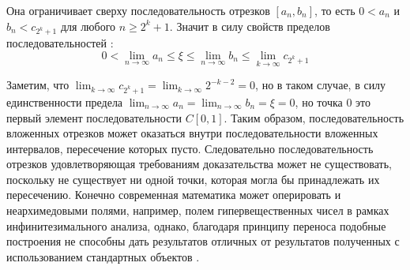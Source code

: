 \documentclass[12pt]{article}
\begin{document}
Она ограничивает сверху последовательность отрезков $[a_n, b_n]$, то есть $0 < a_n$ и $b_n < c_{2^k + 1}$ для любого $n \geq 2^k + 1$. Значит в силу свойств пределов последовательностей \cite{matan-limit-properties}:
\begin{equation}
0 < \lim_{n\to\infty} a_n \leq \xi \leq \lim_{n\to\infty} b_n \leq \lim_{k\to\infty} c_{2^k + 1}
\end{equation}

Заметим, что $\lim_{k\to\infty} c_{2^k + 1} = \lim_{k\to\infty} 2^{- k - 2} = 0$, но в таком случае, в силу единственности предела \cite{matan-limit-properties} $\lim_{n\to\infty} a_n = \lim_{n\to\infty} b_n = \xi = 0$, но точка $0$ это первый элемент последовательности $C[0, 1]$. Таким образом, последовательность вложенных отрезков может оказаться внутри последовательности вложенных интервалов, пересечение которых пусто. Следовательно последовательность отрезков удовлетворяющая требованиям доказательства может не существовать, поскольку не существует ни одной точки, которая могла бы принадлежать их пересечению. Конечно современная математика может оперировать и неархимедовыми полями, например, полем гипервещественных чисел в рамках инфинитезимального анализа, однако, благодаря принципу переноса подобные построения не способны дать результатов отличных от результатов полученных с использованием стандартных объектов \cite{infinitesimal-transfer-principle}. 
\end{document}
